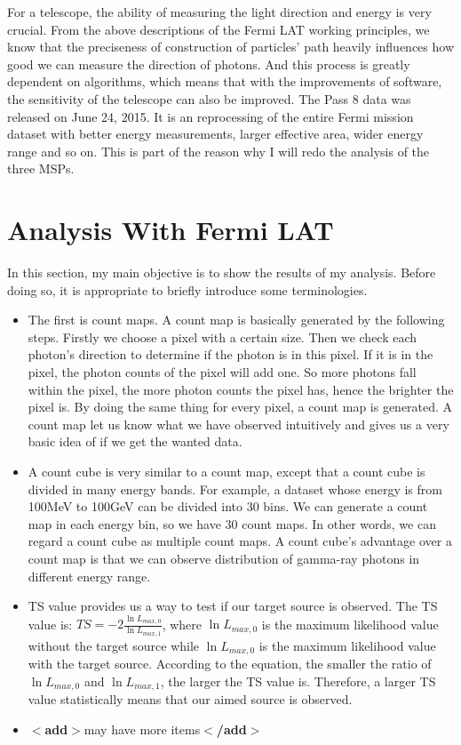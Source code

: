 \documentclass[12pt]{report}
\newcommand{\add}[1]{
  $<$\textbf{add}$>$#1$<$\textbf{/add}$>$
}
\begin{document}
        For a telescope, the ability of measuring the light direction and energy is very crucial. 
        From the above descriptions of the Fermi LAT working principles, we know that the preciseness of 
        construction of particles' path heavily influences how good we can measure the direction of photons. 
        And this process is greatly dependent on algorithms, which means that with the improvements of software,
        the sensitivity of the telescope can also be improved. The Pass 8 data was released on June 24, 2015.
        It is an reprocessing of the entire Fermi mission dataset with better energy measurements, larger effective 
        area, wider energy range and so on. This is part of the reason why I will redo the analysis of the three MSPs.

      \section{Analysis With Fermi LAT}
        In this section, my main objective is to show the results of my analysis. Before doing so, it is 
        appropriate to briefly introduce some terminologies. 
        \begin{itemize}
          \item The first is count maps. A count map is basically generated by the following steps. Firstly we choose a 
            pixel with a certain size. Then we check each photon's direction to determine if the photon is in this 
            pixel. If it is in the pixel, the photon counts of the pixel will add one. So more photons fall within 
            the pixel, the more photon counts the pixel has, hence the brighter the pixel is. By doing the same thing 
            for every pixel, a count map is generated. A count map let us know what we have observed intuitively and 
            gives us a very basic idea of if we get the wanted data. 
          \item A count cube is very similar to a count map, except that a count cube is divided in many energy
            bands. For example, a dataset whose energy is from 100MeV to 100GeV can be divided into 30 bins. We can
            generate a count map in each energy bin, so we have 30 count maps. In other words, we can regard a 
            count cube as multiple count maps. A count cube's advantage over a count map is that we can 
            observe distribution of gamma-ray photons in different energy range. 
          \item TS value provides us a way to test if our target source is observed. The TS value is: 
            $TS = -2 \frac{\ln{L_{max, 0}}}{\ln{L_{max, 1}}}$, where $\ln{L_{max, 0}}$ is the maximum likelihood value 
            without the target source while $\ln{L_{max, 0}}$ is the maximum likelihood value with the target source.
            According to the equation, the smaller the ratio of $\ln{L_{max, 0}}$ and $\ln{L_{max, 1}}$, the larger
            the TS value is. Therefore, a larger TS value statistically means that our aimed source is observed. 
          \item \add{may have more items}
        \end{itemize}
\end{document}
